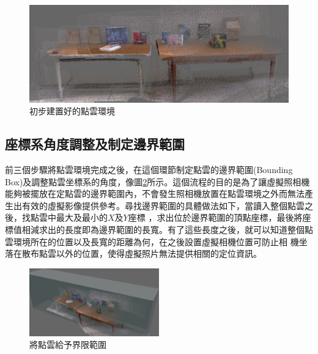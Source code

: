 \begin{figure}
  \includegraphics[width=\textwidth]{figures/3DPoint_Cloud_Map.jpg}
  \caption{初步建置好的點雲環境}
  \label{fig:Point Cloud Map}
\end{figure}

\subsection{座標系角度調整及制定邊界範圍}
     
    前三個步驟將點雲環境完成之後，在這個環節制定點雲的邊界範圍(Bounding Box)及調整點雲坐標系的角度，像圖\ref{fig:Bounding Box}所示。這個流程的目的是為了讓虛擬照相機
    能夠被擺放在定點雲的邊界範圍內，不會發生照相機放置在點雲環境之外而無法產生出有效的虛擬影像提供參考。尋找邊界範圍的具體做法如下，當讀入整個點雲之後，找點雲中最大及最小的$X$及$Y$座標
    ，求出位於邊界範圍的頂點座標，最後將座標值相減求出的長度即為邊界範圍的長寬。有了這些長度之後，就可以知道整個點雲環境所在的位置以及長寬的距離為何，在之後設置虛擬相機位置可防止相
    機坐落在散布點雲以外的位置，使得虛擬照片無法提供相關的定位資訊。

\begin{figure}
\begin{center}
  \includegraphics[width=0.5\textwidth]{figures/Bounding_Box.jpg}
  \caption{將點雲給予界限範圍}
  \label{fig:Bounding Box}
\end{center}
\end{figure}   
    
